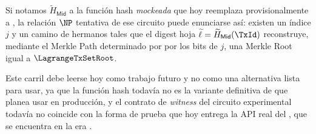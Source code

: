 Si notamos $\widetilde{H}_{\mathsf{Mid}}$ a la función hash \emph{mockeada} que hoy reemplaza provisionalmente a \MidnightPoseidonHash, la relación $\NP$ tentativa de ese circuito puede enunciarse así: existen un índice $j$ y un camino de hermanos tales que el digest hoja $\widetilde{\ell} = \widetilde{H}_{\mathsf{Mid}}(\TxId)$ reconstruye, mediante el Merkle Path determinado por por los bits de $j$, una Merkle Root igual a $\LagrangeTxSetRoot$.

Este carril debe leerse hoy como trabajo futuro y no como una alternativa lista para usar, ya que la función hash todavía no es la variante definitiva de \MidnightPoseidonHash que \Mithril planea usar en producción, y el contrato de \textit{witness} del circuito experimental todavía no coincide con la forma de prueba que hoy entrega la API real del \MithrilAggregator, que se encuentra en la era \Pythagoras.
